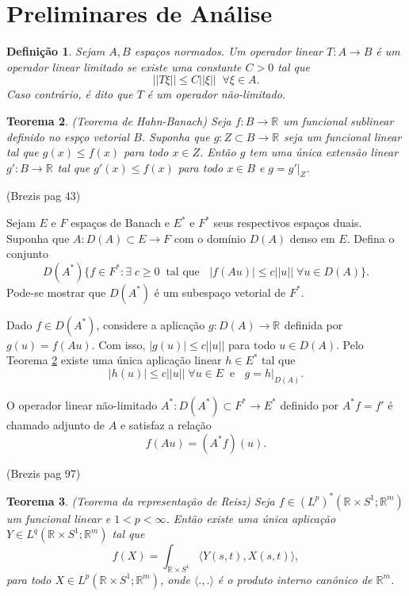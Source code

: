 \documentclass[12pt]{book}
\newtheorem{teorema}{Teorema}[section]
\newtheorem{definicao}[teorema]{Definição}
\newcommand{\circulo}{S^{1}}
\newcommand{\espacoLpcontradominio}[2]{L^{p}(#1;#2)}
\newcommand{\espacoLpadjuntoretacirculo}{L^{q}(\retacartesianocirculo;\real{m})}
\newcommand{\espacoLpdual}{(L^{p})^{*}(\retacartesianocirculo;\real{m})}
\newcommand{\norma}[1]{||#1||}
\newcommand{\produtointerno}[2]{\langle #1, #2 \rangle}
\newcommand{\retacartesianocirculo}{\real{} \times \circulo}
\newcommand{\real}[1]{\mathbb{R}^{#1}}
\newcommand{\reta}{\real{}}
\newcommand{\aviso}[1]{{\color{violet}(#1)}}
\begin{document}
	\section{Preliminares de Análise}\label{apendice_preliminares_analise}
	\begin{definicao}
		Sejam $A,B$ espaços normados. Um operador linear $T:A\to B$ é um operador linear limitado se existe uma constante $C>0$ tal que
		$$
		\norma{T\xi} \leq C\norma{\xi}\;\;\forall \xi \in A.
		$$
		Caso contrário, é dito que $T$ é um operador não-limitado.
	\end{definicao}
	
	\begin{teorema}\label{teorema_hahn_banach}
		(Teorema de Hahn-Banach) Seja $f:B \to \reta$ um funcional sublinear definido no espço vetorial $B$. Suponha que $g:Z \subset B \to \reta$ seja um funcional linear tal que $g(x)\leq f(x)$ para todo $x \in Z$. Então $g$ tem uma única extensão linear $g': B \to \reta$ tal que $g'(x)\leq f(x)$ para todo $x \in B$ e $g=g'|_{Z}$.
	\end{teorema}
	
	
	\aviso{Brezis pag 43}
	
	Sejam $E$ e $F$ espaços de Banach e $E^{*}$ e $F^{*}$ seus respectivos espaços duais. Suponha que $A: D(A)\subset E\to F$ com o domínio $D(A)$ denso em $E$. Defina o conjunto 
	$$
	D(A^{*})\{ f\in F^{*}: \exists\;c\geq 0\;\;\text{tal que }\;\; |f(Au)|\leq c\norma{u}\;\forall u\in D(A)\}.
	$$
	Pode-se mostrar que $D(A^{*})$ é um subespaço vetorial de $F^{*}$.
	
	Dado $f\in D(A^{*})$, considere a aplicação $g:D(A)\to \reta$ definida por $g(u) = f(Au)$. Com isso, $|g(u)|\leq c\norma{u}$ para todo $u\in D(A)$. Pelo Teorema \ref{teorema_hahn_banach} existe uma única aplicação linear $h\in E^{*}$ tal que 
	$$
	|h(u)|\leq c\norma{u} \;\forall u \in E \;\;\text{e }\;\; g=h|_{D(A)}.
	$$
	
	O operador linear não-limitado $A^{*}:D(A^{*})\subset F^{*}\to E^{*}$ definido por $A^{*}f=f'$ é chamado adjunto de $A$ e satisfaz a relação
	$$
	f(Au) = (A^{*}f)(u).
	$$
	
	\aviso{Brezis pag 97}
	
	\begin{teorema}\label{teorema_representacao_reiz}
		(Teorema da representação de Reisz) Seja $f \in \espacoLpdual$ um funcional linear e $1<p<\infty$. Então existe uma única aplicação $Y \in \espacoLpadjuntoretacirculo$ tal que
		$$
		f(X) = \int_{\retacartesianocirculo}\produtointerno{Y(s,t)}{X(s,t)},
		$$
		para todo $X \in \espacoLpcontradominio{\retacartesianocirculo}{\real{m}}$, onde $\produtointerno{.}{.}$ é o produto interno canônico de $\real{m}$.
	\end{teorema}
	
\end{document}
